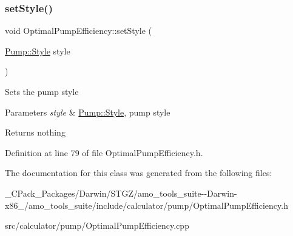 \subsubsection{\texorpdfstring{set\+Style()}{setStyle()}\hspace{0.1cm}{\footnotesize\ttfamily [3/3]}}
{\footnotesize\ttfamily void Optimal\+Pump\+Efficiency\+::set\+Style (\begin{DoxyParamCaption}\item[{\hyperlink{class_pump_aef354601ce4218258cc898b35a1e90ff}{Pump\+::\+Style}}]{style }\end{DoxyParamCaption})\hspace{0.3cm}{\ttfamily [inline]}}

Sets the pump style


\begin{DoxyParams}{Parameters}
{\em style} & \hyperlink{class_pump_aef354601ce4218258cc898b35a1e90ff}{Pump\+::\+Style}, pump style\\
\hline
\end{DoxyParams}
\begin{DoxyReturn}{Returns}
nothing 
\end{DoxyReturn}


Definition at line 79 of file Optimal\+Pump\+Efficiency.\+h.



The documentation for this class was generated from the following files\+:\begin{DoxyCompactItemize}
\item 
\+\_\+\+C\+Pack\+\_\+\+Packages/\+Darwin/\+S\+T\+G\+Z/amo\+\_\+tools\+\_\+suite-\/-\/\+Darwin-\/x86\+\_/amo\+\_\+tools\+\_\+suite/include/calculator/pump/Optimal\+Pump\+Efficiency.\+h\item 
src/calculator/pump/Optimal\+Pump\+Efficiency.\+cpp\end{DoxyCompactItemize}
